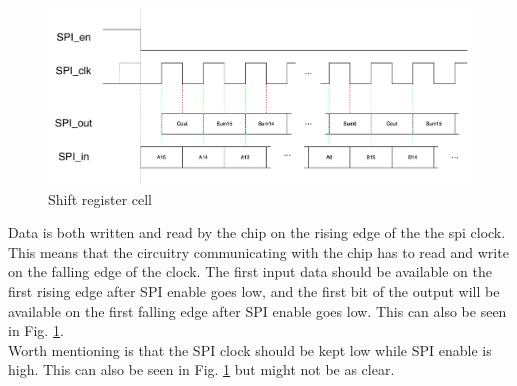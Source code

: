 \begin{figure}[H]
\centering
\captionsetup{justification=centering}
\includegraphics[scale=0.35]{../figures/spi_interface.png}
\caption{Shift register cell}
\label{spi_int}
\end{figure} 

Data is both written and read by the chip on the rising edge of the the spi clock. This means that the circuitry communicating with the chip has to read and write on the falling edge of the clock. The first input data should be available on the first rising edge after SPI enable goes low, and the first bit of the output will be available on the first falling edge after SPI enable goes low. This can also be seen in Fig. \ref{spi_int}.\\
Worth mentioning is that the SPI clock should be kept low while SPI enable is high. This can also be seen in Fig. \ref{spi_int} but might not be as clear.


